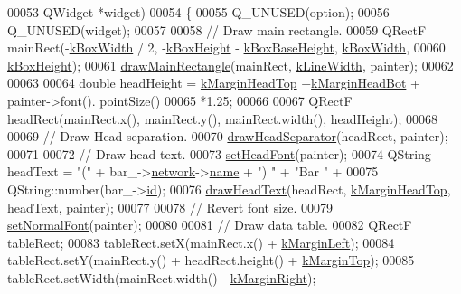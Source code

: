 \begin{DoxyCode}
00053                     QWidget *widget)
00054 \{
00055   Q\_UNUSED(option);
00056   Q\_UNUSED(widget);
00057 
00058   \textcolor{comment}{// Draw main rectangle.}
00059   QRectF mainRect(-\hyperlink{class_info_bar_a58f7773f4265d7e759f2eeb4c9aac48d}{kBoxWidth} / 2, -\hyperlink{class_info_bar_aedf2e766968ea9ba3e691f24efb8c117}{kBoxHeight} - 
      \hyperlink{class_info_bar_a0f2f7b614000ae1d317ec3819acabbf2}{kBoxBaseHeight}, \hyperlink{class_info_bar_a58f7773f4265d7e759f2eeb4c9aac48d}{kBoxWidth},
00060                   \hyperlink{class_info_bar_aedf2e766968ea9ba3e691f24efb8c117}{kBoxHeight});
00061   \hyperlink{class_info_bar_a5d5440d1ca77a5366e51ac9e6f6aa4d3}{drawMainRectangle}(mainRect, \hyperlink{class_info_bar_a9592abdb63cc3cfffc6e5826f998a353}{kLineWidth}, painter);
00062 
00063 
00064   \textcolor{keywordtype}{double} headHeight = \hyperlink{class_info_bar_ae4ec64a4c58d29eb6c7378b4621bc6c2}{kMarginHeadTop} +\hyperlink{class_info_bar_aed15b9f28cc4a43d509c3553b032fa5e}{kMarginHeadBot} + painter->font().
      pointSize()
00065                       *1.25;
00066 
00067   QRectF headRect(mainRect.x(), mainRect.y(), mainRect.width(), headHeight);
00068 
00069   \textcolor{comment}{// Draw Head separation.}
00070   \hyperlink{class_info_bar_a9b89dc7229ecee097d9ca9c4e6fa38f2}{drawHeadSeparator}(headRect, painter);
00071 
00072   \textcolor{comment}{// Draw head text.}
00073   \hyperlink{class_info_bar_a9d49c5f446e209ac2a99f48991040745}{setHeadFont}(painter);
00074   QString headText = \textcolor{stringliteral}{"("} + bar\_->\hyperlink{class_bar_a80025f13884750add58cc61b318357ff}{network}->\hyperlink{class_network_ab6643733a517f930c60b06f5ffd78186}{name} + \textcolor{stringliteral}{") "} + \textcolor{stringliteral}{"Bar "} +
00075                      QString::number(bar\_->\hyperlink{class_bar_a9dc5c6a6d44fe412ae34ef8a881b8dce}{id});
00076   \hyperlink{class_info_bar_a912f4b2babec3df1aad3d31bc54a6e34}{drawHeadText}(headRect, \hyperlink{class_info_bar_ae4ec64a4c58d29eb6c7378b4621bc6c2}{kMarginHeadTop}, headText, painter);
00077 
00078   \textcolor{comment}{// Revert font size.}
00079   \hyperlink{class_info_bar_a2bfda27ec3d1ae6b4b1c927876f594c1}{setNormalFont}(painter);
00080 
00081   \textcolor{comment}{// Draw data table.}
00082   QRectF tableRect;
00083   tableRect.setX(mainRect.x() + \hyperlink{class_info_bar_a2ed246fc7b7917ba8141b55cbd023d5c}{kMarginLeft});
00084   tableRect.setY(mainRect.y() + headRect.height() + \hyperlink{class_info_bar_a810c3286fc4d960d04ffbd31318ebff2}{kMarginTop});
00085   tableRect.setWidth(mainRect.width() - \hyperlink{class_info_bar_aa16c67708cd2ab938e1dc8be5f168614}{kMarginRight});

\end{DoxyCode}
